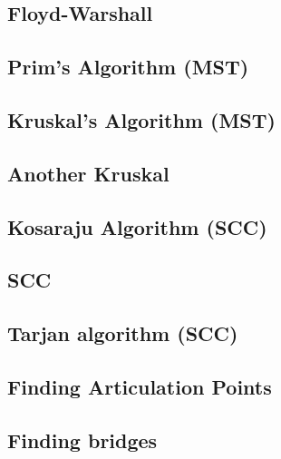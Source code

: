 \documentclass[10pt]{article}
\begin{document}
\begin{multicols*}{2}
\subsection{Floyd-Warshall}


\subsection{Prim's Algorithm (MST)}


\subsection{Kruskal's Algorithm (MST)}


\subsection{Another Kruskal}


\subsection{Kosaraju Algorithm (SCC)}


\subsection{SCC}


\subsection{Tarjan algorithm (SCC)}


\subsection{Finding Articulation Points}


\subsection{Finding bridges}



\end{multicols*}
\end{document}
